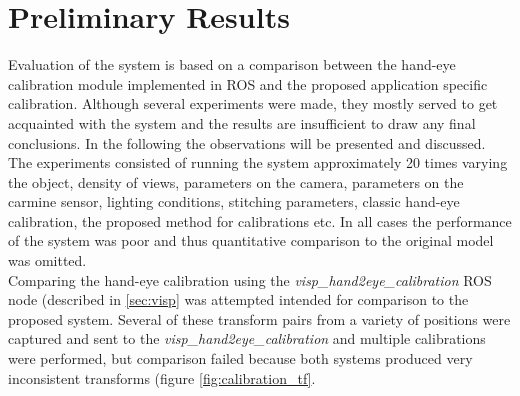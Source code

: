 \chapter{Preliminary Results}
Evaluation of the system is based on a comparison between the hand-eye calibration module implemented in ROS and the proposed application specific calibration. Although several experiments were made, they mostly served to get acquainted with the system and the results are insufficient to draw any final conclusions. In the following the observations will be presented and discussed.\\

The experiments consisted of running the system approximately 20 times varying the object, density of views, parameters on the camera, parameters on the carmine sensor, lighting conditions, stitching parameters, classic hand-eye calibration, the proposed method for calibrations etc. In all cases the performance of the system was poor and thus quantitative comparison to the original model was omitted. \\

Comparing the hand-eye calibration using the \textit{visp\_hand2eye\_calibration} ROS node (described in \ref{sec:visp} was attempted intended for comparison to the proposed system. Several of these transform pairs from a variety of positions were captured and sent to the  \textit{visp\_hand2eye\_calibration} and multiple calibrations were performed, but comparison failed because both systems produced very inconsistent transforms (figure \ref{fig:calibration_tf}. \\

